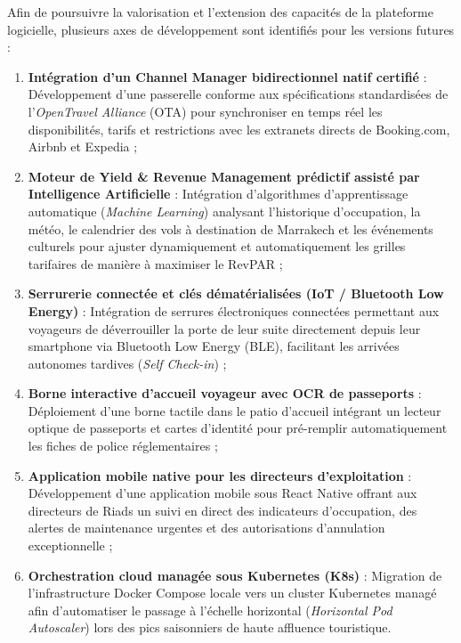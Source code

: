 Afin de poursuivre la valorisation et l'extension des capacités de la plateforme logicielle, plusieurs axes de développement sont identifiés pour les versions futures :

\begin{enumerate}
    \item \textbf{Intégration d'un Channel Manager bidirectionnel natif certifié} : Développement d'une passerelle conforme aux spécifications standardisées de l'\textit{OpenTravel Alliance} (OTA) pour synchroniser en temps réel les disponibilités, tarifs et restrictions avec les extranets directs de Booking.com, Airbnb et Expedia ;
    \item \textbf{Moteur de Yield \& Revenue Management prédictif assisté par Intelligence Artificielle} : Intégration d'algorithmes d'apprentissage automatique (\textit{Machine Learning}) analysant l'historique d'occupation, la météo, le calendrier des vols à destination de Marrakech et les événements culturels pour ajuster dynamiquement et automatiquement les grilles tarifaires de manière à maximiser le RevPAR ;
    \item \textbf{Serrurerie connectée et clés dématérialisées (IoT / Bluetooth Low Energy)} : Intégration de serrures électroniques connectées permettant aux voyageurs de déverrouiller la porte de leur suite directement depuis leur smartphone via Bluetooth Low Energy (BLE), facilitant les arrivées autonomes tardives (\textit{Self Check-in}) ;
    \item \textbf{Borne interactive d'accueil voyageur avec OCR de passeports} : Déploiement d'une borne tactile dans le patio d'accueil intégrant un lecteur optique de passeports et cartes d'identité pour pré-remplir automatiquement les fiches de police réglementaires ;
    \item \textbf{Application mobile native pour les directeurs d'exploitation} : Développement d'une application mobile sous React Native offrant aux directeurs de Riads un suivi en direct des indicateurs d'occupation, des alertes de maintenance urgentes et des autorisations d'annulation exceptionnelle ;
    \item \textbf{Orchestration cloud managée sous Kubernetes (K8s)} : Migration de l'infrastructure Docker Compose locale vers un cluster Kubernetes managé afin d'automatiser le passage à l'échelle horizontal (\textit{Horizontal Pod Autoscaler}) lors des pics saisonniers de haute affluence touristique.
\end{enumerate}

\clearpage

